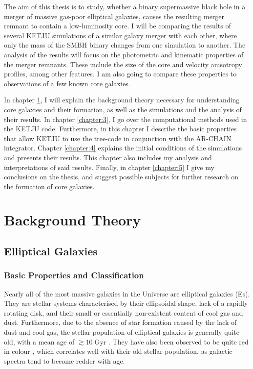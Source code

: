 \documentclass[english, twoside]{HYgradu}
\begin{document}
The aim of this thesis is to study, whether a binary supermassive black hole in a merger of massive gas-poor elliptical galaxies, causes the resulting merger remnant to contain a low-luminosity core. I will be comparing the results of several KETJU simulations of a similar galaxy merger with each other, where only the mass of the SMBH binary changes from one simulation to another. The analysis of the results will focus on the photometric and kinematic properties of the merger remnants. These include the size of the core and velocity anisotropy profiles, among other features. I am also going to compare these properties to observations of a few known core galaxies. 

In chapter \ref{chapter:2}, I will explain the background theory necessary for understanding core galaxies and their formation, as well as the simulations and the analysis of their results. In chapter \ref{chapter:3}, I go over the computational methods used in the KETJU code. Furthermore, in this chapter I describe the basic properties that allow KETJU to use the tree-code in conjunction with the AR-CHAIN integrator. Chapter \ref{chapter:4} explains the initial conditions of the simulations and presents their results. This chapter also includes my analysis and interpretations of said results. Finally, in chapter \ref{chapter:5} I give my conclusions on the thesis, and suggest possible subjects for further research on the formation of core galaxies.

\chapter{Background Theory} \label{chapter:2}

\section{Elliptical Galaxies} \label{section:elliptical}

\subsection{Basic Properties and Classification}

Nearly all of the most massive galaxies in the Universe are elliptical galaxies (Es). They are stellar systems characterised by their ellipsoidal shape, lack of a rapidly rotating disk, and their small or essentially non-existent content of cool gas and dust. Furthermore, due to the absence of star formation caused by the lack of dust and cool gas, the stellar population of elliptical galaxies is generally quite old, with a mean age of $\gtrsim{10} \; \mathrm{Gyr}$ \citep{GalaxyFormationAndEvo2010}. They have also been observed to be quite red in colour \citep{Cappellari2016}, which correlates well with their old stellar population, as galactic spectra tend to become redder with age.
\end{document}
